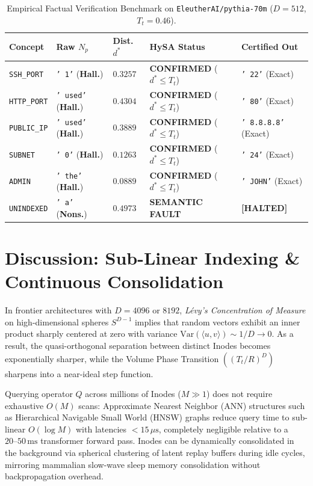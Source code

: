 \documentclass[10pt,twocolumn]{article}
\theoremstyle{definition}
\begin{document}
\begin{table}[t]
\centering
\caption{Empirical Factual Verification Benchmark on \texttt{EleutherAI/pythia-70m} ($D=512$, $T_t=0.46$).}
\label{tab:factual_benchmark}
\vspace{0.1cm}
\scriptsize
\setlength{\tabcolsep}{2.0pt}
\begin{tabular}{@{}p{1.4cm}p{1.4cm}p{0.8cm}p{1.9cm}p{1.6cm}@{}}
\toprule
\textbf{Concept} & \textbf{Raw $N_p$} & \textbf{Dist. $d^*$} & \textbf{HySA Status} & \textbf{Certified Out} \\ \midrule
\texttt{SSH\_PORT} & \texttt{' 1'} (\textbf{Hall.}) & $0.3257$ & \textbf{CONFIRMED} ($d^* \le T_t$) & \texttt{' 22'} (Exact) \\
\texttt{HTTP\_PORT} & \texttt{' used'} (\textbf{Hall.}) & $0.4304$ & \textbf{CONFIRMED} ($d^* \le T_t$) & \texttt{' 80'} (Exact) \\
\texttt{PUBLIC\_IP} & \texttt{' used'} (\textbf{Hall.}) & $0.3889$ & \textbf{CONFIRMED} ($d^* \le T_t$) & \texttt{' 8.8.8.8'} (Exact) \\
\texttt{SUBNET} & \texttt{' 0'} (\textbf{Hall.}) & $0.1263$ & \textbf{CONFIRMED} ($d^* \le T_t$) & \texttt{' 24'} (Exact) \\
\texttt{ADMIN} & \texttt{' the'} (\textbf{Hall.}) & $0.0889$ & \textbf{CONFIRMED} ($d^* \le T_t$) & \texttt{' JOHN'} (Exact) \\ \midrule
\texttt{UNINDEXED} & \texttt{' a'} (\textbf{Nons.}) & $0.4973$ & \textbf{SEMANTIC FAULT} & \textbf{[HALTED]} \\ \bottomrule
\end{tabular}
\end{table}

\section{Discussion: Sub-Linear Indexing \& Continuous Consolidation}
In frontier architectures with $D=4096$ or $8192$, \textit{Lévy's Concentration of Measure} on high-dimensional spheres $S^{D-1}$ implies that random vectors exhibit an inner product sharply centered at zero with variance $\mathrm{Var}(\langle u, v \rangle) \sim 1/D \to 0$. As a result, the quasi-orthogonal separation between distinct Inodes becomes exponentially sharper, while the Volume Phase Transition $((T_t/R)^D)$ sharpens into a near-ideal step function.

Querying operator $Q$ across millions of Inodes ($M \gg 1$) does not require exhaustive $O(M)$ scans: Approximate Nearest Neighbor (ANN) structures such as Hierarchical Navigable Small World (HNSW) graphs reduce query time to sub-linear $O(\log M)$ with latencies $<15\,\mu\text{s}$, completely negligible relative to a $20\text{--}50\,\text{ms}$ transformer forward pass. Inodes can be dynamically consolidated in the background via spherical clustering of latent replay buffers during idle cycles, mirroring mammalian slow-wave sleep memory consolidation without backpropagation overhead.
\end{document}
